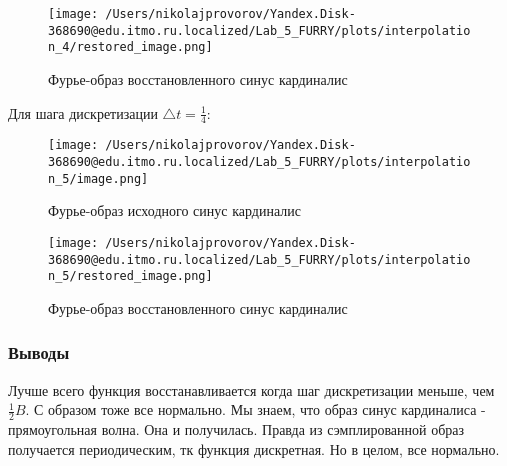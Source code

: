 \begin{figure}[ht!]
    \centering
    \texttt{[image: /Users/nikolajprovorov/Yandex.Disk-368690@edu.itmo.ru.localized/Lab\_5\_FURRY/plots/interpolation\_4/restored\_image.png]}
    \caption{Фурье-образ восстановленного синус кардиналис}
\end{figure}

\clearpage

Для шага дискретизации $\triangle t = \frac{1}{4}$:

\begin{figure}[ht!]
    \centering
    \texttt{[image: /Users/nikolajprovorov/Yandex.Disk-368690@edu.itmo.ru.localized/Lab\_5\_FURRY/plots/interpolation\_5/image.png]}
    \caption{Фурье-образ исходного синус кардиналис}
\end{figure}

\begin{figure}[ht!]
    \centering
    \texttt{[image: /Users/nikolajprovorov/Yandex.Disk-368690@edu.itmo.ru.localized/Lab\_5\_FURRY/plots/interpolation\_5/restored\_image.png]}
    \caption{Фурье-образ восстановленного синус кардиналис}
\end{figure}

\clearpage

\subsubsection{Выводы}

Лучше всего функция восстанавливается когда шаг дискретизации меньше, чем $\frac{1}{2}B$. С образом тоже все нормально. Мы знаем, что образ синус кардиналиса - прямоугольная волна. Она и получилась. Правда из сэмплированной образ получается периодическим, тк функция дискретная. Но в целом, все нормально.